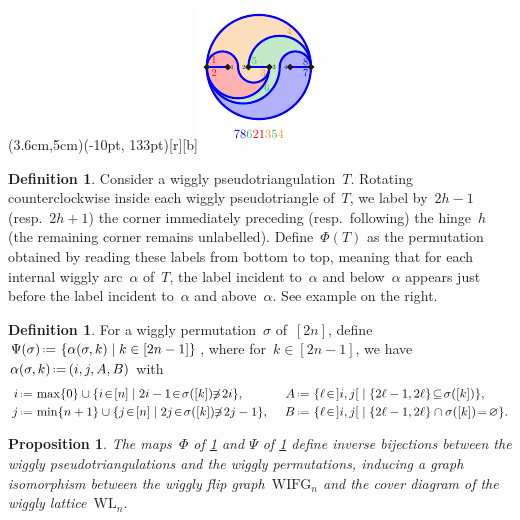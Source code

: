 \documentclass[submission]{FPSAC2025}
\newtheorem{proposition}[theorem]{Proposition}
\theoremstyle{definition}
\newtheorem{definition}[theorem]{Definition}
\newcommand{\set}[2]{\left\{ #1 \;\middle|\; #2 \right\}} %
\newcommand{\eqdef}{\mbox{\,\raisebox{0.2ex}{\scriptsize\ensuremath{\mathrm:}}\ensuremath{=}\,}} %
\newcommand{\wigglyIncreasingFlipGraph}{\mathrm{WIFG}} %
\newcommand{\wigglyLattice}{\mathrm{WL}} %
\begin{document}

\parpic(3.6cm,5cm)(-10pt, 133pt)[r][b]{\includegraphics[scale=2]{bijection}}{
\begin{definition}
\label{def:bijection1}
Consider a wiggly pseudotriangulation~$T$.
Rotating counterclockwise inside each wiggly pseudotriangle of~$T$, we label by~$2h-1$ (resp.~$2h+1$) the corner immediately preceding (resp.~following) the hinge~$h$ (the remaining corner remains unlabelled).
Define~$\Phi(T)$ as the permutation obtained by reading these labels from bottom to top, meaning that for each internal wiggly arc~$\alpha$ of~$T$, the label incident to~$\alpha$ and below~$\alpha$ appears just before the label incident to~$\alpha$ and above~$\alpha$.
See example on the right.
\end{definition}

\begin{definition}
\label{def:bijection2}
For a wiggly permutation~$\sigma$ of~$[2n]$, define~$\Psi(\sigma) \eqdef \set{\alpha(\sigma, k)}{k \in [2n-1]}$, where for~$k \in [2n-1]$, we have~$\alpha(\sigma, k) \eqdef ( i, j, A, B)$ with
\begin{alignat*}{3}
i & \eqdef \max \{0\} \cup \set{i \!\in\! [n]}{2i-1 \!\in\! \sigma([k]) \!\!\not\ni\! 2i}\!, \quad &
A & \eqdef \set{\ell \!\in\! {]i,j[}}{\{2\ell-1, 2\ell\} \!\subseteq\! \sigma([k])}\!, \\
j & \eqdef \min \{n+1\} \cup \set{j \!\in\! [n]}{2j \!\in\! \sigma([k]) \!\!\not\ni\! 2j-1}\!, \;\, &
B & \eqdef \set{\ell \!\in\! {]i,j[}}{\{2\ell-1, 2\ell\} \cap \sigma([k]) \!=\! \varnothing} \!.
\end{alignat*}
\end{definition}
}

\begin{proposition}
\label{prop:bijection}
The maps~$\Phi$ of \cref{def:bijection1} and $\Psi$ of \cref{def:bijection2} define inverse bijections between the wiggly pseudotriangulations and the wiggly permutations, inducing a graph isomorphism between the wiggly flip graph~$\wigglyIncreasingFlipGraph_n$ and the cover diagram of the wiggly lattice~$\wigglyLattice_n$.
\end{proposition}
\end{document}
